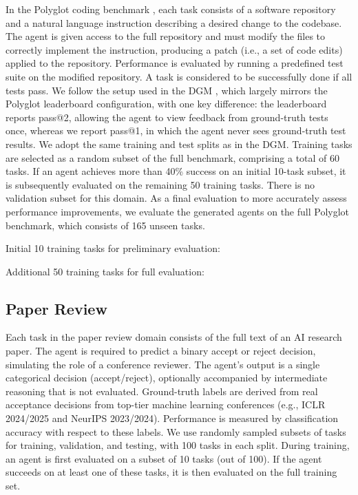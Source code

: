 \documentclass[]{fairmeta}
\begin{document}
In the Polyglot coding benchmark \citep{gauthier2024polyglot}, each task consists of a software repository and a natural language instruction describing a desired change to the codebase. The agent is given access to the full repository and must modify the files to correctly implement the instruction, producing a patch (i.e., a set of code edits) applied to the repository. Performance is evaluated by running a predefined test suite on the modified repository. A task is considered to be successfully done if all tests pass. We follow the setup used in the DGM \citep{zhang2025darwin}, which largely mirrors the Polyglot leaderboard configuration, with one key difference: the leaderboard reports pass@2, allowing the agent to view feedback from ground-truth tests once, whereas we report pass@1, in which the agent never sees ground-truth test results. We adopt the same training and test splits as in the DGM. Training tasks are selected as a random subset of the full benchmark, comprising a total of 60 tasks. If an agent achieves more than 40\% success on an initial 10-task subset, it is subsequently evaluated on the remaining 50 training tasks. There is no validation subset for this domain. As a final evaluation to more accurately assess performance improvements, we evaluate the generated agents on the full Polyglot benchmark, which consists of 165 unseen tasks.

Initial 10 training tasks for preliminary evaluation:

Additional 50 training tasks for full evaluation:


\subsection{Paper Review}
\label{app:domain-paperreview}

Each task in the paper review domain consists of the full text of an AI research paper. The agent is required to predict a binary accept or reject decision, simulating the role of a conference reviewer. The agent's output is a single categorical decision (accept/reject), optionally accompanied by intermediate reasoning that is not evaluated. Ground-truth labels are derived from real acceptance decisions from top-tier machine learning conferences (e.g., ICLR 2024/2025 and NeurIPS 2023/2024). Performance is measured by classification accuracy with respect to these labels.
We use randomly sampled subsets of tasks for training, validation, and testing, with 100 tasks in each split. During training, an agent is first evaluated on a subset of 10 tasks (out of 100). If the agent succeeds on at least one of these tasks, it is then evaluated on the full training set.
\end{document}
